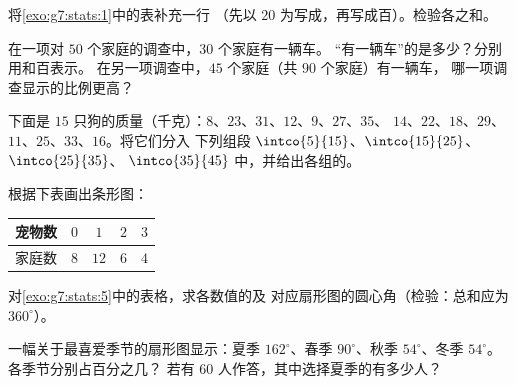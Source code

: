 \begin{exercise}[$\star$]\label{exo:g7:stats:2}
将\cref{exo:g7:stats:1}中的表补充一行
（先以 $20$ 为写成，再写成百）。检验各之和。
\end{exercise}

\begin{exercise}[$\star$]\label{exo:g7:stats:3}
在一项对 $50$ 个家庭的调查中，$30$ 个家庭有一辆车。
“有一辆车”的是多少？分别用和百表示。
在另一项调查中，$45$ 个家庭（共 $90$ 个家庭）有一辆车，
哪一项调查显示的比例更高？
\end{exercise}

\begin{exercise}[$\star$]\label{exo:g7:stats:4}
下面是 $15$ 只狗的质量（千克）：$8$、$23$、$31$、$12$、$9$、$27$、$35$、
$14$、$22$、$18$、$29$、$11$、$25$、$33$、$16$。将它们分入
下列组段 $\intco{5}{15}$、$\intco{15}{25}$、$\intco{25}{35}$、
$\intco{35}{45}$ 中，并给出各组的。
\end{exercise}

\begin{exercise}[$\star$]\label{exo:g7:stats:5}
根据下表画出条形图：
\begin{center}
\renewcommand{\arraystretch}{1.2}
\begin{tabular}{l|cccc}
宠物数 & $0$ & $1$ & $2$ & $3$ \\
\hline
家庭数 & $8$ & $12$ & $6$ & $4$ \\
\end{tabular}
\end{center}
\end{exercise}

\begin{exercise}[$\star$]\label{exo:g7:stats:6}
对\cref{exo:g7:stats:5}中的表格，求各数值的及
对应扇形图的圆心角（检验：总和应为 $360^\circ$）。
\end{exercise}

\begin{exercise}[$\star$]\label{exo:g7:stats:7}
一幅关于最喜爱季节的扇形图显示：夏季 $162^\circ$、春季
$90^\circ$、秋季 $54^\circ$、冬季 $54^\circ$。各季节分别占百分之几？
若有 $60$ 人作答，其中选择夏季的有多少人？
\end{exercise}

